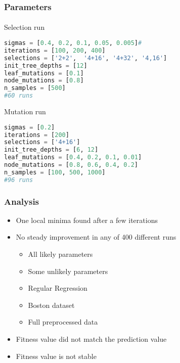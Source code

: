 \documentclass{beamer}
\begin{document}
\begin{frame}[fragile]
\frametitle{Parameters}
\framesubtitle{}
\begin{block}{Selection run}
\begin{lstlisting}[language=Python]
sigmas = [0.4, 0.2, 0.1, 0.05, 0.005]#
iterations = [100, 200, 400]
selections = ['2+2',  '4+16', '4+32', '4,16']
init_tree_depths = [12]
leaf_mutations = [0.1]
node_mutations = [0.8]
n_samples = [500]
#60 runs
\end{lstlisting}
\end{block}

\begin{block}{Mutation run}
\begin{lstlisting}[language=Python]
sigmas = [0.2]
iterations = [200]
selections = ['4+16']
init_tree_depths = [6, 12]
leaf_mutations = [0.4, 0.2, 0.1, 0.01]
node_mutations = [0.8, 0.6, 0.4, 0.2]
n_samples = [100, 500, 1000]
#96 runs
\end{lstlisting}
\end{block}
\end{frame}


\begin{frame}[fragile]
\frametitle{Analysis}

\begin{itemize}
\item One local minima found after a few iterations
\item No steady improvement in any of 400 different runs

\begin{itemize}
\item All likely parameters
\item Some unlikely parameters 
\item Regular Regression
\item Boston dataset
\item Full preprocessed data
\end{itemize}

\item Fitness value did not match the prediction value
\item Fitness value is not stable
\end{itemize}



\end{frame}
\end{document}
